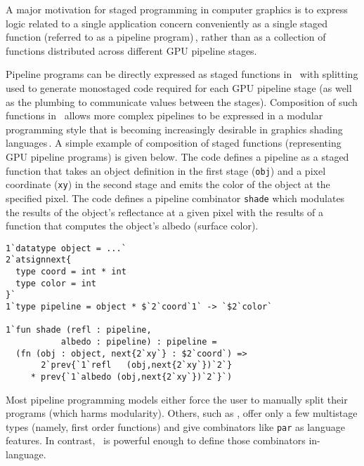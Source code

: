 A major motivation for staged programming in computer graphics is to express
logic related to a single application concern conveniently as a single staged
function (referred to as a pipeline program)\,\cite{Foley:2011}, rather than
as a collection of functions distributed across different GPU pipeline stages.  

Pipeline programs can be directly expressed as staged functions in \lang\, with splitting 
used to generate monostaged code required for each GPU pipeline stage
(as well as the plumbing to communicate values between the stages).
Composition of such functions in \lang\ allows more complex pipelines to be expressed in a modular programming style
that is becoming increasingly desirable in graphics shading languages\,\cite{Foley:2011,He:2014}. A simple example of composition of staged functions (representing GPU pipeline programs) is given below.  The code defines a pipeline as a staged function that takes an object definition in the first stage (\texttt{obj}) and a pixel coordinate (\texttt{xy}) in the second stage and emits the color of the object at the specified pixel. The code defines a pipeline combinator \texttt{shade} which modulates the results of the object's reflectance at a given pixel with the results of a function that computes the object's albedo (surface color).  
%
\begin{lstlisting} 
1`datatype object = ...`
2`atsignnext{
  type coord = int * int
  type color = int
}`
1`type pipeline = object * $`2`coord`1` -> `$2`color`

1`fun shade (refl : pipeline,
           albedo : pipeline) : pipeline =
  (fn (obj : object, next{2`xy`} : $2`coord`) =>
       2`prev{`1`refl   (obj,next{2`xy`})`2`}
     * prev{`1`albedo (obj,next{2`xy`})`2`}`)
\end{lstlisting}
%
Most pipeline programming models either force the user to manually split their programs (which harms modularity).
Others, such as \cite{Foley:2011}, offer only a few multistage types (namely, first order functions) and give 
combinators like \texttt{par} as language features.
In contrast, \lang\ is powerful enough to define those combinators in-language.

